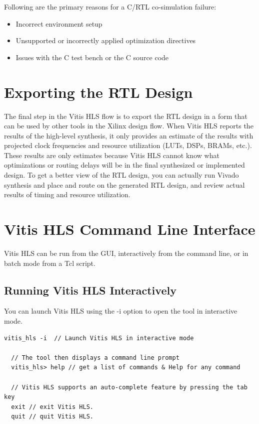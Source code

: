 \par Following are the primary reasons for a C/RTL co-simulation failure:
\begin{itemize}
  \item Incorrect environment setup
  \item Unsupported or incorrectly applied optimization directives
  \item Issues with the C test bench or the C source code
\end{itemize}

\section{Exporting the RTL Design}
The final step in the Vitis HLS flow is to export the RTL design in a form that can be used by other tools in the Xilinx design flow. When Vitis HLS reports the results of the high-level synthesis, it only provides an estimate of the results with projected clock frequencies and resource utilization (LUTs, DSPs, BRAMs, etc.). These results are only estimates because Vitis HLS cannot know what optimizations or routing delays will be in the final synthesized or implemented design. To get a better view of the RTL design, you can actually run Vivado synthesis and place and route on the generated RTL design, and review actual results of timing and resource utilization.

\clearpage
\section{Vitis HLS Command Line Interface}
Vitis HLS can be run from the GUI, interactively from the command line, or in batch mode from a Tcl script.

\subsection{Running Vitis HLS Interactively}
You can launch Vitis HLS using the -i option to open the tool in interactive mode.

\begin{lstlisting}[style=CStyle] 
  vitis_hls -i  // Launch Vitis HLS in interactive mode

  // The tool then displays a command line prompt
  vitis_hls> help // get a list of commands & Help for any command 

  // Vitis HLS supports an auto-complete feature by pressing the tab key
  exit // exit Vitis HLS.
  quit // quit Vitis HLS.
\end{lstlisting}

